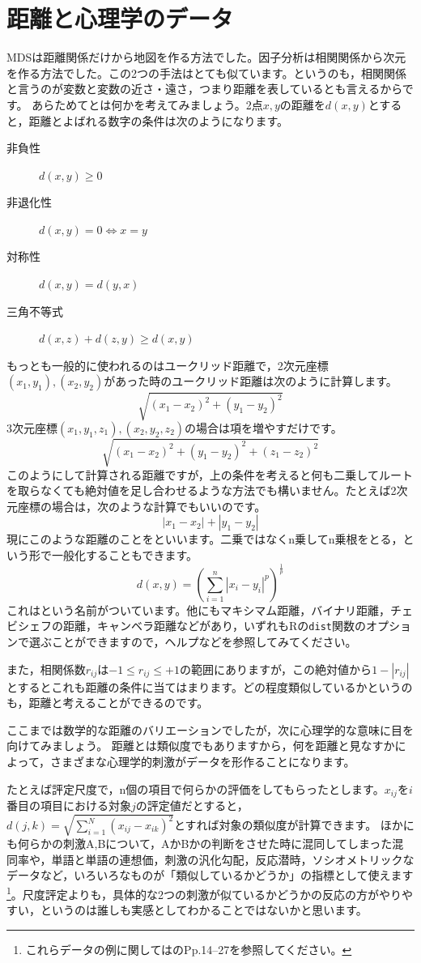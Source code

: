 \documentclass{ltjsbook}
\begin{document}
\section{距離と心理学のデータ}
\label{distance}
MDSは距離関係だけから地図を作る方法でした。因子分析は相関関係から次元を作る方法でした。この2つの手法はとても似ています。というのも，相関関係と言うのが変数と変数の近さ・遠さ，つまり距離を表しているとも言えるからです。
あらためてとは何かを考えてみましょう。2点$x,y$の距離を$d(x,y)$とすると，距離とよばれる数字の条件は次のようになります。
\begin{description}
	\item[非負性] $d(x,y)\ge 0$
	\item[非退化性] $d(x,y)=0 \Leftrightarrow x=y$
	\item[対称性] $d(x,y)=d(y,x)$
	\item[三角不等式] $d(x,z) + d(z,y) \ge d(x,y)$
\end{description}
もっとも一般的に使われるのはユークリッド距離で，2次元座標$(x_1,y_1),(x_2,y_2)$があった時のユークリッド距離は次のように計算します。
\[ \sqrt{(x_1-x_2)^2+(y_1-y_2)^2} \]
3次元座標$(x_1,y_1,z_1),(x_2,y_2,z_2)$の場合は項を増やすだけです。
\[ \sqrt{(x_1-x_2)^2+(y_1-y_2)^2+(z_1-z_2)^2} \]
このようにして計算される距離ですが，上の条件を考えると何も二乗してルートを取らなくても絶対値を足し合わせるような方法でも構いません。たとえば2次元座標の場合は，次のような計算でもいいのです。
\[ |x_1-x_2|+|y_1-y_2| \]
現にこのような距離のことをといいます。二乗ではなくn乗してn乗根をとる，という形で一般化することもできます。
\[ d(x,y) = \left( \sum_{i=1}^n |x_i - y_i|^p\right)^{\frac{1}{p}} \]
これはという名前がついています。他にもマキシマム距離，バイナリ距離，チェビシェフの距離，キャンベラ距離などがあり，いずれもRの\texttt{dist}関数のオプションで選ぶことができますので，ヘルプなどを参照してみてください。

また，相関係数$r_{ij}$は$-1 \le r_{ij} \le +1$の範囲にありますが，この絶対値から$1-|r_{ij}|$とするとこれも距離の条件に当てはまります。どの程度類似しているかというのも，距離と考えることができるのです。

ここまでは数学的な距離のバリエーションでしたが，次に心理学的な意味に目を向けてみましょう。
距離とは類似度でもありますから，何を距離と見なすかによって，さまざまな心理学的刺激がデータを形作ることになります。

たとえば評定尺度で，n個の項目で何らかの評価をしてもらったとします。$x_{ij}$を$i$番目の項目における対象$j$の評定値だとすると，
$d(j,k) = \sqrt{\sum_{i=1}^N (x_{ij}-x_{ik})^2 }$とすれば対象の類似度が計算できます。
ほかにも何らかの刺激A,Bについて，AかBかの判断をさせた時に混同してしまった混同率や，単語と単語の連想価，刺激の汎化勾配，反応潜時，ソシオメトリックなデータなど，いろいろなものが「類似しているかどうか」の指標として使えます\footnote{これらデータの例に関しては\textcite{Takane198002}のPp.14--27を参照してください。}。尺度評定よりも，具体的な2つの刺激が似ているかどうかの反応の方がやりやすい，というのは誰しも実感としてわかることではないかと思います。
\end{document}

